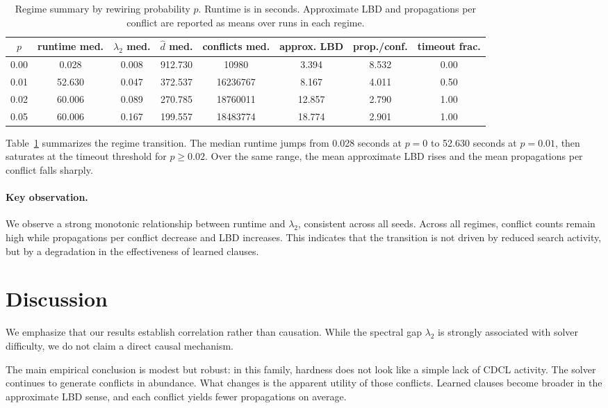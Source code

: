 \documentclass[11pt]{article}
\begin{document}
\begin{table}[t]
\centering
\small
\begin{tabular}{cccccccc}
\toprule
$p$ & runtime med. & $\lambda_2$ med. & $\hat d$ med. & conflicts med. & approx. LBD & prop./conf. & timeout frac. \\
\midrule
0.00 & 0.028 & 0.008 & 912.730 & 10980 & 3.394 & 8.532 & 0.00 \\
0.01 & 52.630 & 0.047 & 372.537 & 16236767 & 8.167 & 4.011 & 0.50 \\
0.02 & 60.006 & 0.089 & 270.785 & 18760011 & 12.857 & 2.790 & 1.00 \\
0.05 & 60.006 & 0.167 & 199.557 & 18483774 & 18.774 & 2.901 & 1.00 \\
\bottomrule
\end{tabular}
\caption{Regime summary by rewiring probability $p$. Runtime is in seconds. Approximate LBD and propagations per conflict are reported as means over runs in each regime.}
\label{tab:summary}
\end{table}

Table~\ref{tab:summary} summarizes the regime transition. The median runtime jumps from 0.028 seconds at $p=0$ to 52.630 seconds at $p=0.01$, then saturates at the timeout threshold for $p \geq 0.02$. Over the same range, the mean approximate LBD rises and the mean propagations per conflict falls sharply.

\paragraph{Key observation.}
We observe a strong monotonic relationship between runtime and $\lambda_2$, consistent across all seeds.
Across all regimes, conflict counts remain high while propagations per conflict decrease and LBD increases. 
This indicates that the transition is not driven by reduced search activity, but by a degradation in the effectiveness of learned clauses.

\section{Discussion}

We emphasize that our results establish correlation rather than causation. While the spectral gap $\lambda_2$ is strongly associated with solver difficulty, we do not claim a direct causal mechanism.

The main empirical conclusion is modest but robust: in this family, hardness does not look like a simple lack of CDCL activity. The solver continues to generate conflicts in abundance. 
What changes is the apparent utility of those conflicts. Learned clauses become broader in the approximate LBD sense, and each conflict yields fewer propagations on average.
\end{document}
